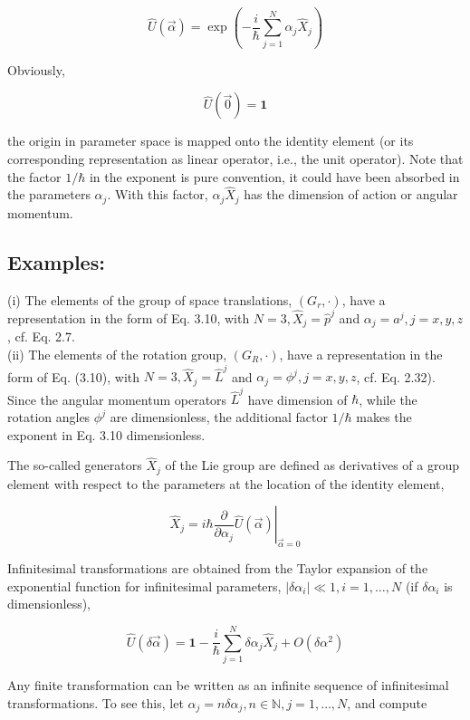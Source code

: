 \documentclass[10pt, letterpaper]{article}
\begin{document}
$$
\hat{U}(\vec{\alpha})=\exp \left(-\frac{i}{\hbar} \sum_{j=1}^{N} \alpha_{j} \hat{X}_{j}\right)
$$

Obviously,

$$
\hat{U}(\overrightarrow{0})=\mathbf{1}
$$

the origin in parameter space is mapped onto the identity element (or its corresponding representation as linear operator, i.e., the unit operator). Note that the factor $1 / \hbar$ in the exponent is pure convention, it could have been absorbed in the parameters $\alpha_{j}$. With this factor, $\alpha_{j} \hat{X}_{j}$ has the dimension of action or angular momentum.



\subsection{Examples:}
(i) The elements of the group of space translations, $\left(G_{r}, \cdot\right)$, have a representation in the form of Eq. 3.10, with $N=3, \hat{X}_{j}=\hat{p}^{j}$ and $\alpha_{j}=a^{j}, j=x, y, z$, cf. Eq. 2.7.\\
(ii) The elements of the rotation group, $\left(G_{R}, \cdot\right)$, have a representation in the form of Eq. (3.10), with $N=3, \hat{X}_{j}=\hat{L}^{j}$ and $\alpha_{j}=\phi^{j}, j=x, y, z$, cf. Eq. 2.32). Since the angular momentum operators $\hat{L}^{j}$ have dimension of $\hbar$, while the rotation angles $\phi^{j}$ are dimensionless, the additional factor $1 / \hbar$ makes the exponent in Eq. 3.10 dimensionless.

The so-called generators $\hat{X}_{j}$ of the Lie group are defined as derivatives of a group element with respect to the parameters at the location of the identity element,

$$
\hat{X}_{j}=\left.i \hbar \frac{\partial}{\partial \alpha_{j}} \hat{U}(\vec{\alpha})\right|_{\vec{\alpha}=0}
$$

Infinitesimal transformations are obtained from the Taylor expansion of the exponential function for infinitesimal parameters, $\left|\delta \alpha_{i}\right| \ll 1, i=1, \ldots, N$ (if $\delta \alpha_{i}$ is dimensionless),

$$
\hat{U}(\delta \vec{\alpha})=\mathbf{1}-\frac{i}{\hbar} \sum_{j=1}^{N} \delta \alpha_{j} \hat{X}_{j}+O\left(\delta \alpha^{2}\right)
$$

Any finite transformation can be written as an infinite sequence of infinitesimal transformations. To see this, let $\alpha_{j}=n \delta \alpha_{j}, n \in \mathbb{N}, j=1, \ldots, N$, and compute
\end{document}
